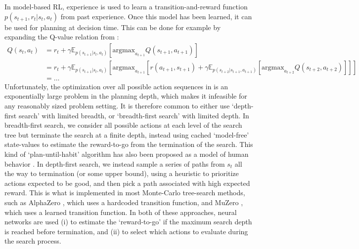 In model-based RL, experience is used to learn a transition-and-reward function $p(s_{t+1}, r_t | s_t, a_t)$ from past experience.
Once this model has been learned, it can be used for planning at decision time.
This can be done for example by expanding the Q-value relation from :
{\small
\begin{align}
    \label{eq:Q-search}
    Q(s_t,a_t) &=  r_t + \gamma \mathbb{E}_{p(s_{t+1} | s_t, a_t)} \left [ \text{argmax}_{a_{t+1}} Q(s_{t+1}, a_{t+1}) \right ]\\
    &= r_t + \gamma \mathbb{E}_{p(s_{t+1} | s_t, a_t)} \left [ \text{argmax}_{a_{t+1}}
    \left [ r(a_{t+1}, s_{t+1}) + \gamma \mathbb{E}_{p(s_{t+2} | s_{t+1}, a_{t+1})} \left [ \text{argmax}_{a_{t+2}} Q(s_{t+2}, a_{t+2}) \right ] \right ] \right ] \\
    &= \ldots
\end{align}
} Unfortunately, the optimization over all possible action sequences in  is an exponentially large problem in the planning depth, which makes it infeasible for any reasonably sized problem setting.
It is therefore common to either use `depth-first search' with limited breadth, or `breadth-first search' with limited depth.
In breadth-first search, we consider all possible actions at each level of the search tree but terminate the search at a finite depth, instead using cached `model-free' state-values to estimate the reward-to-go from the termination of the search.
This kind of `plan-until-habit' algorithm has also been proposed as a model of human behavior \citep{keramati2016adaptive}.
In depth-first search, we instead sample a series of paths from $s_t$ all the way to termination (or some upper bound), using a heuristic to prioritize actions expected to be good, and then pick a path associated with high expected reward.
This is what is implemented in most Monte-Carlo tree-search methods, such as AlphaZero \citep{silver2018general}, which uses a hardcoded transition function, and MuZero \citep{schrittwieser2020mastering}, which uses a learned transition function.
In both of these approaches, neural networks are used (i) to estimate the `reward-to-go' if the maximum search depth is reached before termination, and (ii) to select which actions to evaluate during the search process.

